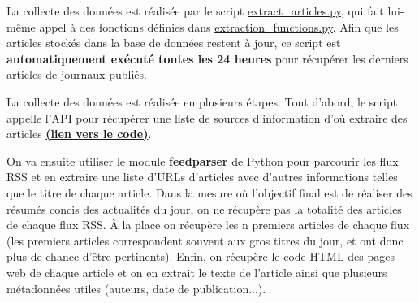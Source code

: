 \documentclass[french]{article}
\begin{document}
    La collecte des données est réalisée par le script \href{https://github.com/vinpap/your_news_anchor/blob/main/extract_articles.py}{extract\_articles.py}, qui fait lui-même appel à des fonctions définies dans \href{https://github.com/vinpap/your_news_anchor/blob/5deffe3be7453d998b2377548902759869e1926d/extraction_functions.py}{extraction\_functions.py}. Afin que les articles stockés dans la base de données restent à jour, ce script est \textbf{automatiquement exécuté toutes les 24 heures} pour récupérer les derniers articles de journaux publiés.
    
    La collecte des données est réalisée en plusieurs étapes. Tout d'abord, le script appelle l'API pour récupérer une liste de sources d'information d'où extraire des articles \href{https://github.com/vinpap/your_news_anchor/blob/5deffe3be7453d998b2377548902759869e1926d/extract_articles.py#L37}{\textbf{(lien vers le code)}}.

    On va ensuite utiliser le module \textbf{\href{https://pypi.org/project/feedparser/}{feedparser}} de Python pour parcourir les flux RSS et en extraire une liste d'URLs d'articles avec d'autres informations telles que le titre de chaque article. Dans la mesure où l'objectif final est de réaliser des résumés concis des actualités du jour, on ne récupère pas la totalité des articles de chaque flux RSS. À la place on récupère les n premiers articles de chaque flux (les premiers articles correspondent souvent aux gros titres du jour, et ont donc plus de chance d'être pertinents).
    Enfin, on récupère le code HTML des pages web de chaque article et on en extrait le texte de l'article ainsi que plusieurs métadonnées utiles (auteurs, date de publication...). 
\end{document}
